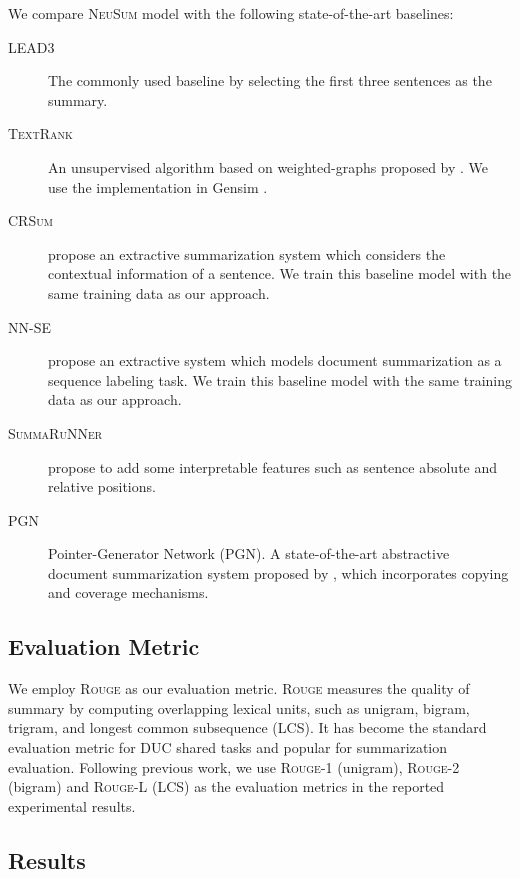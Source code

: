 \documentclass[11pt,a4paper]{article}
\newcommand{\ourModelName}{\textsc{NeuSum}}
\begin{document}
We compare \ourModelName{} model with the following state-of-the-art baselines:
\begin{description}
	\item[\textsc{LEAD3}] The commonly used baseline by selecting the first three sentences as the summary.
	\item[\textsc{TextRank}]  An unsupervised algorithm based on weighted-graphs proposed by \citet{mihalcea2004textrank}. We use the implementation in Gensim \citep{rehurek_lrec}.
	\item[\textsc{CRSum}] \citet{Ren:2017:LCS:3077136.3080792} propose an extractive summarization system which considers the contextual information of a sentence.
	 We train this baseline model with the same training data as our approach.
	\item[\textsc{NN-SE}] \citet{cheng-lapata:2016:P16-1} propose an extractive system which models document summarization as a sequence labeling task. We train this baseline model with the same training data as our approach.
	\item[\textsc{SummaRuNNer}] \citet{nallapati2017summarunner} propose to add some interpretable features such as sentence absolute and relative positions.
	\item[\textsc{PGN}] Pointer-Generator Network (PGN). A state-of-the-art abstractive document summarization system proposed by \citet{see-liu-manning:2017:Long}, which incorporates copying and coverage mechanisms.
\end{description}


\subsection{Evaluation Metric}
We employ \textsc{Rouge} \citep{lin2004rouge} as our evaluation metric.
\textsc{Rouge} measures the quality of summary by computing overlapping lexical units, such as unigram, bigram, trigram, and longest common subsequence (LCS).
It has become the standard evaluation metric for DUC shared tasks and popular for summarization evaluation.
Following previous work, we use \textsc{Rouge}-1 (unigram), \textsc{Rouge}-2 (bigram) and \textsc{Rouge}-L (LCS) as the evaluation metrics in the reported experimental results.


\subsection{Results}
\end{document}
